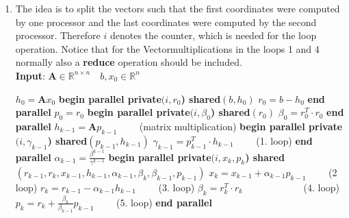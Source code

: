 \documentclass{article}
\begin{document}
\begin{enumerate}[label=(\alph*)]
    
\item
  The idea is to split the vectors such that the first coordinates were computed by one processor and the last coordinates were computed by the second processor. Therefore $i$ denotes the counter, which is needed for the loop operation. Notice that for the Vectormultiplications in the loops 1 and 4 normally also a \textbf{reduce} operation should be included.
  \\
   \textbf{Input}: $ \textbf{A} \in \mathbb{R}^{n\times n} \quad b, x_0\in \mathbb{R}^n$
    \begin{algorithmic}[1]
	\State $h_{0} = \textbf{A}x_{0}$ 
	\State \textbf{begin parallel private$(i, r_{0}$) shared$(b, h_{0})$}
	\State $r_0 = b - h_0$
	\State \textbf{end parallel}
	\State $p_0 = r_0$
	\State \textbf{begin parallel private$(i, \beta_{0}$) shared$(r_0)$}
	\State $\beta_0 = r_0^T\cdot r_0$
	\State \textbf{end parallel}
	\State $h_{k-1} = \textbf{A}p_{k-1}\qquad$ (matrix multiplication)
	\State \textbf{begin parallel private$(i, \gamma_{k-1}$) shared$(p_{k-1}, h_{k-1})$}
	\State $\gamma_{k-1} = p^{T}_{k-1}\cdot h_{k-1}\qquad$ (1. loop)
	\State \textbf{end parallel}
	\State $\alpha_{k-1} = \frac{\beta^{k-1}}{\gamma^{k-1}}$
	\State \textbf{begin parallel private$(i,x_k, p_k$) shared$(r_{k-1}, r_k,x_{k-1}, h_{k-1},\alpha_{k-1},\beta_k, \beta_{k-1}, p_{k-1})$}
	\State $x_k = x_{k-1} + \alpha_{k-1}p_{k-1}\qquad$ (2 loop)
	\State $r_k = r_{k-1} - \alpha_{k-1}h_{k-1}\qquad$ (3. loop)
	\State $\beta_k = r_k^T\cdot r_k\qquad \qquad \qquad$ (4. loop)
	\State $p_k = r_{k} + \frac{\beta_k}{\beta_{k-1}}p_{k-1}\qquad$ (5. loop)
	\State \textbf{end parallel}
	\EndFor
    \end{algorithmic}
    


\end{enumerate}
\end{document}
